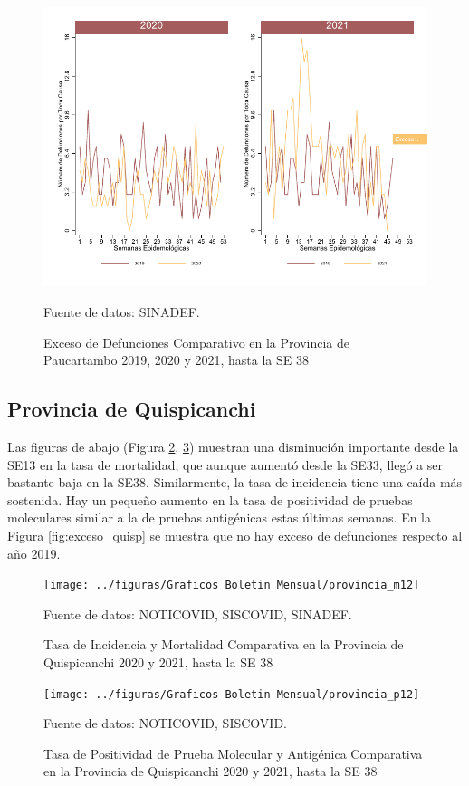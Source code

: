 \documentclass[12pt,a4paper,openany]{book}
\begin{document}
	\begin{figure}[h]
	\caption{Exceso de Defunciones Comparativo en la Provincia de Paucartambo 2019, 2020 y 2021, hasta la SE 38}\label{fig:exceso_paucartam}
	\begin{center}
		\includegraphics[width=0.7\linewidth]{../figuras/exceso_11}
	\end{center}
	{\footnotesize {Fuente de datos: SINADEF.}}
	\end{figure}

\clearpage

	\subsection*{Provincia de Quispicanchi}
	\noindent Las figuras de abajo (Figura \ref{fig:inc_mort_quisp}, \ref{fig:positividad_quisp})  muestran una disminución importante desde la SE13 en la tasa de mortalidad, que aunque aumentó desde la SE33, llegó a ser bastante baja en la SE38. Similarmente, la tasa de incidencia tiene una caída más sostenida. Hay un pequeño aumento en la tasa de positividad de pruebas moleculares similar a la de pruebas antigénicas estas últimas semanas. En la Figura \ref{fig:exceso_quisp} se muestra que no hay exceso de defunciones respecto al año 2019.

	\begin{figure}[h]
	\caption{Tasa de Incidencia y Mortalidad Comparativa en la Provincia de Quispicanchi 2020 y 2021, hasta la SE 38}\label{fig:inc_mort_quisp}
	\begin{center}
		\texttt{[image: ../figuras/Graficos Boletin Mensual/provincia\_m12]}
	\end{center}
	{\footnotesize {Fuente de datos: NOTICOVID, SISCOVID, SINADEF.}}
	\end{figure}

	\begin{figure}[h]
	\caption{Tasa de Positividad de Prueba Molecular y Antigénica Comparativa en la Provincia de Quispicanchi 2020 y 2021, hasta la SE 38}\label{fig:positividad_quisp}
	\begin{center}
		\texttt{[image: ../figuras/Graficos Boletin Mensual/provincia\_p12]}
	\end{center}
	{\footnotesize {Fuente de datos: NOTICOVID, SISCOVID.}}
	\end{figure}
\end{document}
